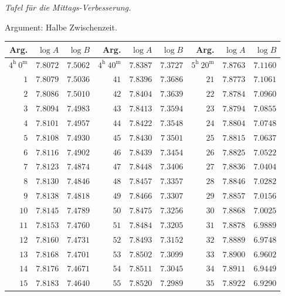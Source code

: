 \begin{center}
\emph{Tafel für die Mittags-Verbesserung.}\par\medskip
Argument: Halbe Zwischenzeit.\par\medskip
\begingroup\fontsize{9}{10.2}\selectfont\setlength{\tabcolsep}{3pt}
\begin{tabular}{r|r|r||r|r|r||r|r|r}
Arg. & $\log A$ & $\log B$ & Arg. & $\log A$ & $\log B$ & Arg. & $\log A$ & $\log B$\\\hline
$4^{\mathrm h}\ 0^{\mathrm m}$ & $7.8072$ & $7.5062$ & $4^{\mathrm h}\ 40^{\mathrm m}$ & $7.8387$ & $7.3727$ & $5^{\mathrm h}\ 20^{\mathrm m}$ & $7.8763$ & $7.1160$\\
$1$ & $7.8079$ & $7.5036$ & $41$ & $7.8396$ & $7.3686$ & $21$ & $7.8773$ & $7.1061$\\
$2$ & $7.8086$ & $7.5010$ & $42$ & $7.8404$ & $7.3639$ & $22$ & $7.8784$ & $7.0960$\\
$3$ & $7.8094$ & $7.4983$ & $43$ & $7.8413$ & $7.3594$ & $23$ & $7.8794$ & $7.0855$\\
$4$ & $7.8101$ & $7.4957$ & $44$ & $7.8422$ & $7.3548$ & $24$ & $7.8804$ & $7.0748$\\
$5$ & $7.8108$ & $7.4930$ & $45$ & $7.8430$ & $7\ 3501$ & $25$ & $7.8815$ & $7.0637$\\
$6$ & $7.8116$ & $7.4902$ & $46$ & $7.8439$ & $7.3454$ & $26$ & $7.8825$ & $7.0522$\\
$7$ & $7.8123$ & $7.4874$ & $47$ & $7.8448$ & $7.3406$ & $27$ & $7.8836$ & $7.0404$\\
$8$ & $7.8130$ & $7.4846$ & $48$ & $7.8457$ & $7.3357$ & $28$ & $7.8846$ & $7.0282$\\
$9$ & $7.8138$ & $7.4818$ & $49$ & $7.8466$ & $7.3307$ & $29$ & $7.8857$ & $7.0156$\\
$10$ & $7.8145$ & $7.4789$ & $50$ & $7.8475$ & $7.3256$ & $30$ & $7.8868$ & $7.0025$\\
$11$ & $7.8153$ & $7.4760$ & $51$ & $7.8484$ & $7.3205$ & $31$ & $7.8878$ & $6.9889$\\
$12$ & $7.8160$ & $7.4731$ & $52$ & $7.8493$ & $7.3152$ & $32$ & $7.8889$ & $6.9748$\\
$13$ & $7.8168$ & $7.4701$ & $53$ & $7.8502$ & $7.3099$ & $33$ & $7.8900$ & $6.9602$\\
$14$ & $7.8176$ & $7.4671$ & $54$ & $7.8511$ & $7.3045$ & $34$ & $7.8911$ & $6.9449$\\
$15$ & $7.8183$ & $7.4640$ & $55$ & $7.8520$ & $7.2989$ & $35$ & $7.8922$ & $6.9290$\\

\end{tabular}
\end{center}
